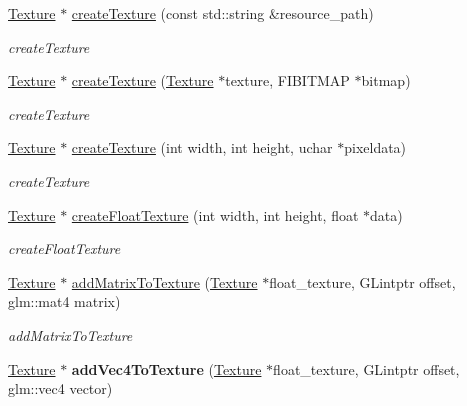 \begin{DoxyCompactItemize}
\item 
\hyperlink{classEngine_1_1Texture}{Texture} $\ast$ \hyperlink{classEngine_1_1TextureManager_a387192344a16b4dc8b0a5d4c9dd5b4fb}{create\+Texture} (const std\+::string \&resource\+\_\+path)
\begin{DoxyCompactList}\small\item\em create\+Texture \end{DoxyCompactList}\item 
\hyperlink{classEngine_1_1Texture}{Texture} $\ast$ \hyperlink{classEngine_1_1TextureManager_a695c76f467b345eb86f2a35005c1f1af}{create\+Texture} (\hyperlink{classEngine_1_1Texture}{Texture} $\ast$texture, F\+I\+B\+I\+T\+M\+A\+P $\ast$bitmap)
\begin{DoxyCompactList}\small\item\em create\+Texture \end{DoxyCompactList}\item 
\hyperlink{classEngine_1_1Texture}{Texture} $\ast$ \hyperlink{classEngine_1_1TextureManager_a53cc1695a0f80e4c1acb7cc22b9d26ee}{create\+Texture} (int width, int height, uchar $\ast$pixeldata)
\begin{DoxyCompactList}\small\item\em create\+Texture \end{DoxyCompactList}\item 
\hyperlink{classEngine_1_1Texture}{Texture} $\ast$ \hyperlink{classEngine_1_1TextureManager_ad31fe2089025a755538d512cbdb5c570}{create\+Float\+Texture} (int width, int height, float $\ast$data)
\begin{DoxyCompactList}\small\item\em create\+Float\+Texture \end{DoxyCompactList}\item 
\hyperlink{classEngine_1_1Texture}{Texture} $\ast$ \hyperlink{classEngine_1_1TextureManager_abc2875cbca8ff89ae318a052176f4e5e}{add\+Matrix\+To\+Texture} (\hyperlink{classEngine_1_1Texture}{Texture} $\ast$float\+\_\+texture, G\+Lintptr offset, glm\+::mat4 matrix)
\begin{DoxyCompactList}\small\item\em add\+Matrix\+To\+Texture \end{DoxyCompactList}\item 
\hypertarget{classEngine_1_1TextureManager_a12c031ba2f44951b75e06a5509721a7e}{}\hyperlink{classEngine_1_1Texture}{Texture} $\ast$ {\bfseries add\+Vec4\+To\+Texture} (\hyperlink{classEngine_1_1Texture}{Texture} $\ast$float\+\_\+texture, G\+Lintptr offset, glm\+::vec4 vector)\label{classEngine_1_1TextureManager_a12c031ba2f44951b75e06a5509721a7e}


\end{DoxyCompactItemize}
